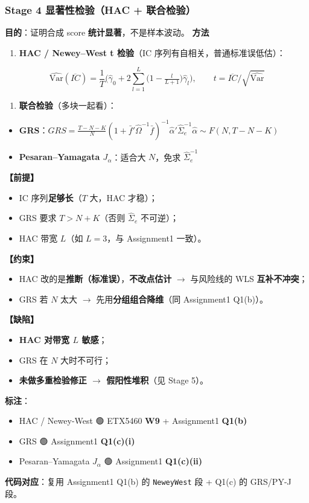 \documentclass[11pt]{article}
\begin{document}
\subsubsection{\texorpdfstring{Stage 4 \textperiodcentered{} 显著性检验（HAC + 联合检验）}{Stage 4 · 显著性检验（HAC + 联合检验）}}
\textbf{目的}：证明合成 score \textbf{统计显著}，不是样本波动。
\textbf{方法}
\begin{enumerate}
  \item \textbf{HAC / Newey--West t 检验}（IC 序列有自相关，普通标准误低估）：
\end{enumerate}
\[
\widehat{\mathrm{Var}}(\overline{IC})=\frac{1}{T}\Big(\hat\gamma_0+2\sum_{l=1}^{L}\big(1-\tfrac{l}{L+1}\big)\hat\gamma_l\Big),\qquad t=\overline{IC}\big/\sqrt{\widehat{\mathrm{Var}}}
\]
\begin{enumerate}
  \item \textbf{联合检验}（多块一起看）：
\end{enumerate}
\begin{itemize}
  \item \textbf{GRS}：$GRS=\frac{T-N-K}{N}(1+\bar f'\hat\Omega^{-1}\bar f)^{-1}\hat\alpha'\hat\Sigma_e^{-1}\hat\alpha\sim F(N,T-N-K)$
  \item \textbf{Pesaran--Yamagata $J_\alpha$}：适合大 $N$，免求 $\hat\Sigma_e^{-1}$
\end{itemize}
\textbf{【前提】}
\begin{itemize}
  \item IC 序列\textbf{足够长}（$T$ 大，HAC 才稳）；
  \item GRS 要求 $T>N+K$（否则 $\hat\Sigma_e$ 不可逆）；
  \item HAC 带宽 $L$（如 $L=3$，与 Assignment1 一致）。
\end{itemize}
\textbf{【约束】}
\begin{itemize}
  \item HAC 改的是\textbf{推断（标准误）}，\textbf{不改点估计} \ensuremath{\rightarrow} 与风险线的 WLS \textbf{互补不冲突}；
  \item GRS 若 $N$ 太大 \ensuremath{\rightarrow} 先用\textbf{分组组合降维}（同 Assignment1 Q1(b)）。
\end{itemize}
\textbf{【缺陷】}
\begin{itemize}
  \item \textbf{HAC 对带宽 $L$ 敏感}；
  \item GRS 在 $N$ 大时不可行；
  \item \textbf{未做多重检验修正 \ensuremath{\rightarrow} 假阳性堆积}（见 Stage 5）。
\end{itemize}
\textbf{标注}：
\begin{itemize}
  \item HAC / Newey-West 🟢 ETX5460 \textbf{W9} + Assignment1 \textbf{Q1(b)}
  \item GRS 🟢 Assignment1 \textbf{Q1(c)(i)}
  \item Pesaran--Yamagata $J_\alpha$ 🟢 Assignment1 \textbf{Q1(c)(ii)}
\end{itemize}
\textbf{代码对应}：复用 Assignment1 Q1(b) 的 \texttt{NeweyWest} 段 + Q1(c) 的 GRS/PY-J 段。
\end{document}
